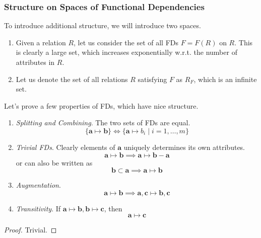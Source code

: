 \documentclass{article}
\begin{document}
    \subsubsection{Structure on Spaces of Functional Dependencies}

      To introduce additional structure, we will introduce two spaces. 
      \begin{enumerate}
        \item Given a relation $R$, let us consider the set of all FDs $F = F(R)$ on $R$. This is clearly a large set, which increases exponentially w.r.t. the number of attributes in $R$. 
        \item Let us denote the set of all relations $R$ satisfying $F$ as $R_F$, which is an infinite set. 
      \end{enumerate}

      \begin{theorem}[Axioms]
        Let's prove a few properties of FDs, which have nice structure. 
        \begin{enumerate}
          \item \textit{Splitting and Combining}. The two sets of FDs are equal. 
            \begin{equation}
              \{\mathbf{a} \mapsto \mathbf{b}\} \iff \{ \mathbf{a} \mapsto b_i \mid i = 1, \ldots, m\}
            \end{equation}

          \item \textit{Trivial FDs}. Clearly elements of $\mathbf{a}$ uniquely determines its own attributes. 
            \begin{equation}
              \mathbf{a} \mapsto \mathbf{b} \implies \mathbf{a} \mapsto \mathbf{b} - \mathbf{a}
            \end{equation}
            or can also be written as 
            \begin{equation}
              \mathbf{b} \subset \mathbf{a} \implies \mathbf{a} \mapsto \mathbf{b}
            \end{equation}

          \item \textit{Augmentation}. 
            \begin{equation}
              \mathbf{a} \mapsto \mathbf{b} \implies \mathbf{a}, \mathbf{c} \mapsto \mathbf{b}, \mathbf{c}
            \end{equation}

          \item \textit{Transitivity}. If $\mathbf{a} \mapsto \mathbf{b}, \mathbf{b} \mapsto \mathbf{c}$, then 
            \begin{equation}
              \mathbf{a} \mapsto \mathbf{c}
            \end{equation}
        \end{enumerate}
      \end{theorem}
      \begin{proof}
        Trivial. 
      \end{proof}
\end{document}
